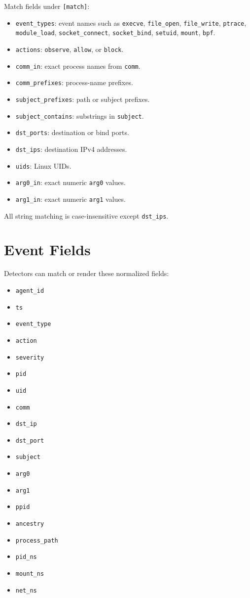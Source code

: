 \documentclass[
  12pt,
]{report}
\providecommand{\tightlist}{%
  \setlength{\itemsep}{0pt}\setlength{\parskip}{0pt}}
\begin{document}
Match fields under \texttt{{[}match{]}}:

\begin{itemize}
\tightlist
\item
  \texttt{event\_types}: event names such as \texttt{execve},
  \texttt{file\_open}, \texttt{file\_write}, \texttt{ptrace},
  \texttt{module\_load}, \texttt{socket\_connect},
  \texttt{socket\_bind}, \texttt{setuid}, \texttt{mount}, \texttt{bpf}.
\item
  \texttt{actions}: \texttt{observe}, \texttt{allow}, or \texttt{block}.
\item
  \texttt{comm\_in}: exact process names from \texttt{comm}.
\item
  \texttt{comm\_prefixes}: process-name prefixes.
\item
  \texttt{subject\_prefixes}: path or subject prefixes.
\item
  \texttt{subject\_contains}: substrings in \texttt{subject}.
\item
  \texttt{dst\_ports}: destination or bind ports.
\item
  \texttt{dst\_ips}: destination IPv4 addresses.
\item
  \texttt{uids}: Linux UIDs.
\item
  \texttt{arg0\_in}: exact numeric \texttt{arg0} values.
\item
  \texttt{arg1\_in}: exact numeric \texttt{arg1} values.
\end{itemize}

All string matching is case-insensitive except \texttt{dst\_ips}.

\section{Event Fields}\label{event-fields}

Detectors can match or render these normalized fields:

\begin{itemize}
\tightlist
\item
  \texttt{agent\_id}
\item
  \texttt{ts}
\item
  \texttt{event\_type}
\item
  \texttt{action}
\item
  \texttt{severity}
\item
  \texttt{pid}
\item
  \texttt{uid}
\item
  \texttt{comm}
\item
  \texttt{dst\_ip}
\item
  \texttt{dst\_port}
\item
  \texttt{subject}
\item
  \texttt{arg0}
\item
  \texttt{arg1}
\item
  \texttt{ppid}
\item
  \texttt{ancestry}
\item
  \texttt{process\_path}
\item
  \texttt{pid\_ns}
\item
  \texttt{mount\_ns}
\item
  \texttt{net\_ns}
\end{itemize}
\end{document}
